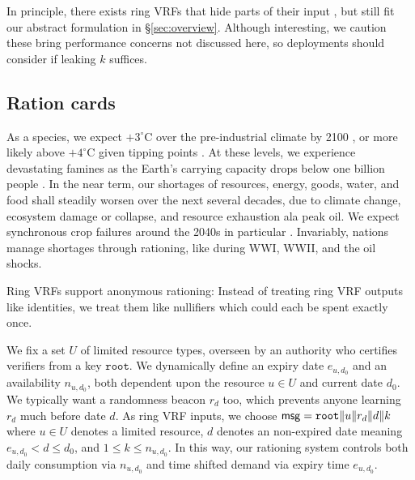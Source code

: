 
In principle, there exists ring VRFs that hide parts of their input
\msg, but still fit our abstract formulation in \S\ref{sec:overview}.
Although interesting, we caution these bring performance concerns not
discussed here, so deployments should consider if leaking $k$ suffices.


\subsection{Ration cards}
\label{subsec:app_ration_carts}

As a species, we expect $+3^{\circ}$C over the pre-industrial climate
by 2100 \cite{IPCC2022}, or more likely above $+4^{\circ}$C given
tipping points \cite{tipping2022}.  %
At these levels, we experience devastating famines as the Earth's
carrying capacity drops below one billion people \cite{carrying_capacity}.
In the near term, our shortages of resources, energy, goods, water,
and food shall steadily worsen over the next several decades, due to
climate change, ecosystem damage or collapse, and resource exhaustion
ala peak oil.  We expect synchronous crop failures around the 2040s
in particular \cite{climaterisk2021}. %
Invariably, nations manage shortages through rationing, like during WWI, WWII, and the oil shocks.  

Ring VRFs support anonymous rationing:
Instead of treating ring VRF outputs like identities,
we treat them like nullifiers which could each be spent exactly once.

\def\expiry{e}
We fix a set $U$ of limited resource types, overseen by
 an authority who certifies verifiers from a key $\mathtt{root}$.
We dynamically define an expiry date $\expiry_{u,d_0}$ and an availability $n_{u,d_0}$,
both dependent upon the resource $u \in U$ and current date $d_0$.
We typically want a randomness beacon $r_d$ too, which prevents
anyone learning $r_d$ much before date $d$. 
As ring VRF inputs, we choose
 $\mathsf{msg} = \mathtt{root} \| u \| r_d \| d \| k$
where $u \in U$ denotes a limited resource,
 $d$ denotes an non-expired date meaning $\expiry_{u,d_0} < d \le d_0$,
 and $1 \le k \le n_{u,d_0}$.
In this way, our rationing system controls both daily consumption
via $n_{u,d_0}$ and time shifted demand via expiry time $\expiry_{u,d_0}$.

